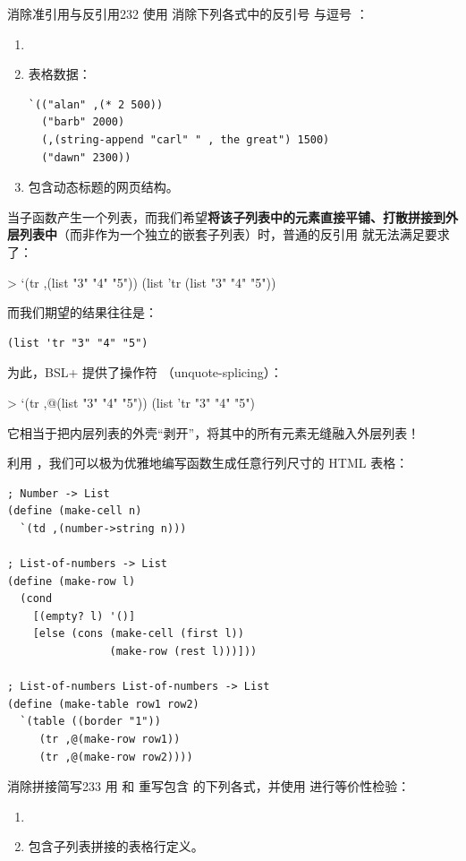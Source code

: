 \begin{exercise}{消除准引用与反引用}{232}
使用  消除下列各式中的反引号 \code{\`{}} 与逗号 \code{, }：
\begin{enumerate}
  \item {}
  \item 表格数据：
\begin{lstlisting}[language=BSL]
`(("alan" ,(* 2 500))
  ("barb" 2000)
  (,(string-append "carl" " , the great") 1500)
  ("dawn" 2300))
\end{lstlisting}
  \item 包含动态标题的网页结构。
\end{enumerate}
\end{exercise}


当子函数产生一个列表，而我们希望\textbf{将该子列表中的元素直接平铺、打散拼接到外层列表中}（而非作为一个独立的嵌套子列表）时，普通的反引用 \code{, } 就无法满足要求了：
\begin{replbox}
> `(tr ,(list "3" "4" "5"))
(list 'tr (list "3" "4" "5"))
\end{replbox}
而我们期望的结果往往是：
\begin{lstlisting}[language=BSL]
(list 'tr "3" "4" "5")
\end{lstlisting}

为此，BSL+ 提供了操作符 （unquote-splicing）：
\begin{replbox}
> `(tr ,@(list "3" "4" "5"))
(list 'tr "3" "4" "5")
\end{replbox}
它相当于把内层列表的外壳“剥开”，将其中的所有元素无缝融入外层列表！

利用 ，我们可以极为优雅地编写函数生成任意行列尺寸的 HTML 表格：
\begin{lstlisting}[language=BSL]
; Number -> List
(define (make-cell n)
  `(td ,(number->string n)))

; List-of-numbers -> List
(define (make-row l)
  (cond
    [(empty? l) '()]
    [else (cons (make-cell (first l))
                (make-row (rest l)))]))

; List-of-numbers List-of-numbers -> List
(define (make-table row1 row2)
  `(table ((border "1"))
     (tr ,@(make-row row1))
     (tr ,@(make-row row2))))
\end{lstlisting}

\begin{exercise}{消除拼接简写}{233}
用  和  重写包含  的下列各式，并使用  进行等价性检验：
\begin{enumerate}
  \item {}
  \item 包含子列表拼接的表格行定义。
\end{enumerate}
\end{exercise}

